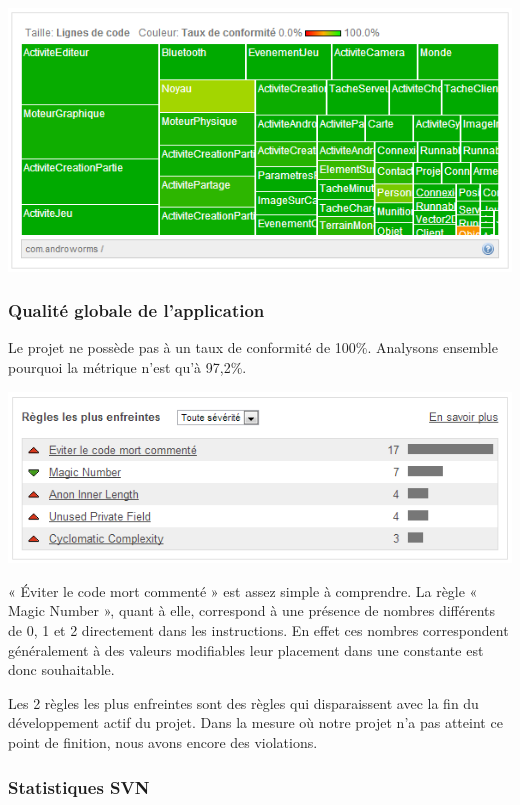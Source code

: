 \documentclass{report}
\begin{document}
\begin{center}
\includegraphics[scale=0.8]{images/state2}
\end{center}

\subsubsection{Qualité globale de l’application}

Le projet ne possède pas à un taux de conformité de 100\%. Analysons
ensemble pourquoi la  métrique n’est qu’à 97,2\%.


\includegraphics[scale=0.75]{images/rules}

« Éviter le code mort commenté » est assez simple à comprendre. La
règle « Magic Number », quant à elle, correspond à une présence de
nombres différents de 0, 1 et 2 directement dans les instructions. En
effet ces nombres correspondent généralement à des valeurs modifiables
leur placement dans une constante est donc souhaitable.

Les 2 règles les plus enfreintes sont des règles qui disparaissent avec
la fin du développement actif du projet. Dans la mesure où notre projet
n’a pas atteint ce point de finition, nous avons encore des violations.

\subsubsection{Statistiques SVN}
\end{document}
